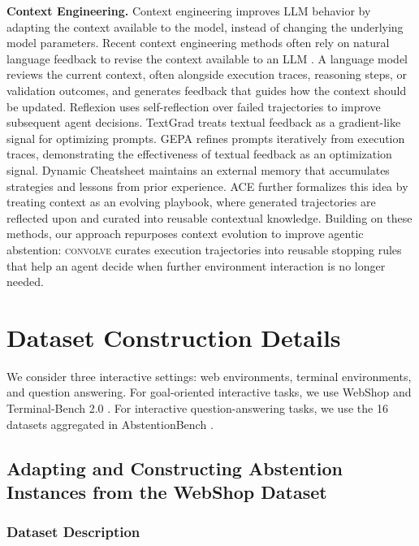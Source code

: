 \documentclass{llmxive}
\providecommand{\method}{\textsc{convolve}\xspace}
\begin{document}
\textbf{Context Engineering.} Context engineering improves LLM behavior by adapting the context available to the model, instead of changing the underlying model parameters. Recent context engineering methods often rely on natural language feedback to revise the context available to an LLM \cite{shinn2023reflexion, yuksekgonul2025optimizing, agrawal2025gepa}. A language model reviews the current context, often alongside execution traces, reasoning steps, or validation outcomes, and generates feedback that guides how the context should be updated. Reflexion \citep{shinn2023reflexion} uses self-reflection over failed trajectories to improve subsequent agent decisions. TextGrad \citep{yuksekgonul2025optimizing} treats textual feedback as a gradient-like signal for optimizing prompts. GEPA \citep{agrawal2025gepa} refines prompts iteratively from execution traces, demonstrating the effectiveness of textual feedback as an optimization signal. Dynamic Cheatsheet \citep{suzgun2026dynamic} maintains an external memory that accumulates strategies and lessons from prior experience. ACE \citep{zhang2025agentic} further formalizes this idea by treating context as an evolving playbook, where generated trajectories are reflected upon and curated into reusable contextual knowledge. Building on these methods, our approach repurposes context evolution to improve agentic abstention: \method curates execution trajectories into reusable stopping rules that help an agent decide when further environment interaction is no longer needed.




\section{Dataset Construction Details}
\label{app:datasets}

We consider three interactive settings: web environments, terminal environments, and question answering. For goal-oriented interactive tasks, we use WebShop \cite{yao2022webshop} and Terminal-Bench 2.0 \cite{merrill2026terminal}. For interactive question-answering tasks, we use the 16 datasets aggregated in AbstentionBench \cite{kirichenko2025abstentionbench}. 


\subsection{Adapting and Constructing Abstention Instances from the WebShop Dataset}

\subsubsection{Dataset Description}
\end{document}
